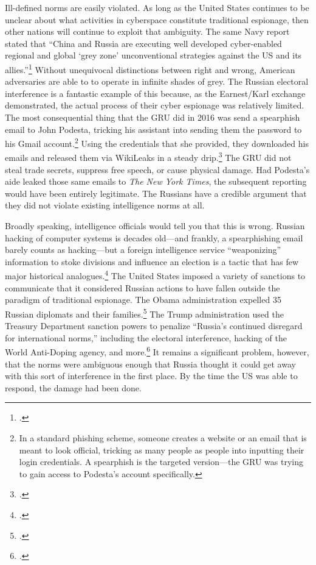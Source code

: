 \documentclass[11pt]{memoir}
\begin{document}
\begin{refsegment}
Ill-defined norms are easily violated. As long as the United States continues to be unclear about what activities in cyberspace constitute traditional espionage, then other nations will continue to exploit that ambiguity. The same Navy report stated that ``China and Russia are executing well developed cyber-enabled regional and global `grey zone' unconventional strategies against the US and its allies.''\footcite[p.~4]{bayer_cybersecurity_2019} Without unequivocal distinctions between right and wrong, American adversaries are able to to operate in infinite shades of grey. The Russian electoral interference is a fantastic example of this because, as the Earnest/Karl exchange demonstrated, the actual process of their cyber espionage was relatively limited. The most consequential thing that the GRU did in 2016 was send a spearphish email to John Podesta, tricking his assistant into sending them the password to his Gmail account.\footnote{In a standard phishing scheme, someone creates a website or an email that is meant to look official, tricking as many people as people into inputting their login credentials. A spearphish is the targeted version---the GRU was trying to gain access to Podesta's account specifically.} Using the credentials that she provided, they downloaded his emails and released them via WikiLeaks in a steady drip.\footcite{nakashima_how_2018} The GRU did not steal trade secrets, suppress free speech, or cause physical damage. Had Podesta's aide leaked those same emails to \emph{The New York Times}, the subsequent reporting would have been entirely legitimate. The Russians have a credible argument that they did not violate existing intelligence norms at all.

Broadly speaking, intelligence officials would tell you that this is wrong. Russian hacking of computer systems is decades old---and frankly, a spearphishing email barely counts as hacking---but a foreign intelligence service ``weaponizing'' information to stoke divisions and influence an election is a tactic that has few major historical analogues.\footcite{nakashima_how_2018} The United States imposed a variety of sanctions to communicate that it considered Russian actions to have fallen outside the paradigm of traditional espionage. The Obama administration expelled 35 Russian diplomats and their families.\footcite{mazzetti_game_2016} The Trump administration used the Treasury Department sanction powers to penalize ``Russia’s continued disregard for international norms,'' including the electoral interference, hacking of the World Anti-Doping agency, and more.\footcite{department_of_the_treasury_treasury_2018} It remains a significant problem, however, that the norms were ambiguous enough that Russia thought it could get away with this sort of interference in the first place. By the time the US was able to respond, the damage had been done.


\end{refsegment}
\end{document}
